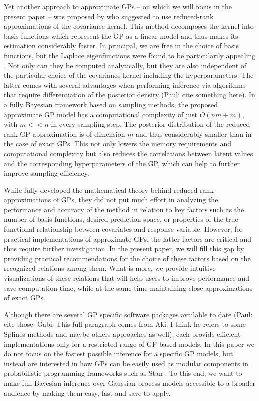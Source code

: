 \documentclass[]{interact}
\theoremstyle{plain}%
\theoremstyle{definition}
\theoremstyle{remark}
\begin{document}
Yet another approach to approximate GPs -- on which we will focus in the present paper -- was proposed by \cite{solin2018hilbert} who suggested to use reduced-rank approximations of the covariance kernel. This method decomposes the kernel into basis functions which represent the GP as a linear model and thus makes its estimation considerably faster. In principal, we are free in the choice of basis functions, but the Laplace eigenfunctions were found to be particularily appealing \citep{solin2018hilbert}. Not only can they be computed analytically, but they are also independent of the particular choice of the covariance kernel including the hyperparameters. The latter comes with several advantages when performing inference via algorithms that require differentiation of the posterior density (Paul: cite something here). In a fully Bayesian framework based on sampling methods, the proposed approximate GP model has a computational complexity of just $O(nm+m)$, with $m<<n$ in every sampling step. The posterior distribution of the reduced-rank GP approximation is of dimension $m$ and thus considerably smaller than in the case of exact GPs. This not only lowers the memory requirements and computational complexity but also reduces the correlations between latent values and the corresponding hyperparameters of the GP, which can help to further improve sampling efficiency.

While \cite{solin2018hilbert} fully developed the mathematical theory behind reduced-rank approximations of GPs, they did not put much effort in analyzing the performance and accuracy of the method in relation to key factors such as the number of basis functions, desired prediction space, or properties of the true functional relationship between covariates and response variable. However, for practical implementations of approximate GPs, the latter factors are critical and thus require further investigation. In the present paper, we will fill this gap by providing practical recommendations for the choice of these factors based on the recognized relations among them. What is more, we provide intuitive visualizations of these relations that will help users to improve performance and save computation time, while at the same time maintaining close approximations of exact GPs. 

Although there are several GP specific software packages available to date (Paul: cite those. Gabi: This full paragraph comes from Aki. I think he refers to some Splines methods and maybe others approaches as well), each provide efficient implementations only for a restricted range of GP based models. In this paper we do not focus on the fastest possible inference for a specific GP models, but instead are interested in how GPs can be easily used as modular components in probabilistic programming frameworks such as Stan \citep{carpenter2017stan}. To this end, we want to make full Bayesian inference over Gaussian process models accessible to a broader audience by making them easy, fast and save to apply. 
\end{document}
